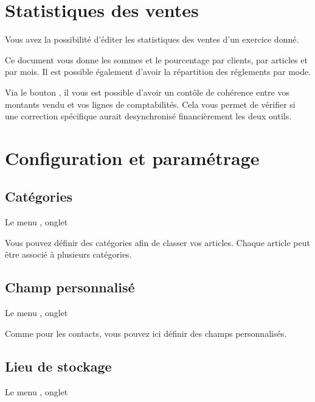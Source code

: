 \documentclass[a4paper,10pt,oneside,french]{sphinxmanual}
\begin{document}
\section{Statistiques des ventes}
\label{\detokenize{invoice/statistics:statistiques-des-ventes}}\label{\detokenize{invoice/statistics::doc}}
\noindent{}

Vous avez la possibilité d’éditer les statistiques des ventes d’un exercice donné.

Ce document vous donne les sommes et le pourcentage par clients, par articles et par mois.
Il est possible également d’avoir la répartition des réglements par mode.

Via le bouton , il vous est possible d’avoir un contôle de cohérence entre vos montants vendu et vos lignes de comptabilités.
Cela vous permet de vérifier si une correction spécifique aurait desynchronisé financièrement les deux outils.


\section{Configuration et paramétrage}
\label{\detokenize{invoice/configuration:configuration-et-parametrage}}\label{\detokenize{invoice/configuration::doc}}

\subsection{Catégories}
\label{\detokenize{invoice/configuration:categories}}
Le menu , onglet 

Vous pouvez définir des catégories afin de classer vos articles.
Chaque article peut être associé à plusieurs catégories.


\subsection{Champ personnalisé}
\label{\detokenize{invoice/configuration:champ-personnalise}}
Le menu , onglet 

Comme pour les contacts, vous pouvez ici définir des champs personnalisés.


\subsection{Lieu de stockage}
\label{\detokenize{invoice/configuration:lieu-de-stockage}}
Le menu , onglet 
\end{document}
